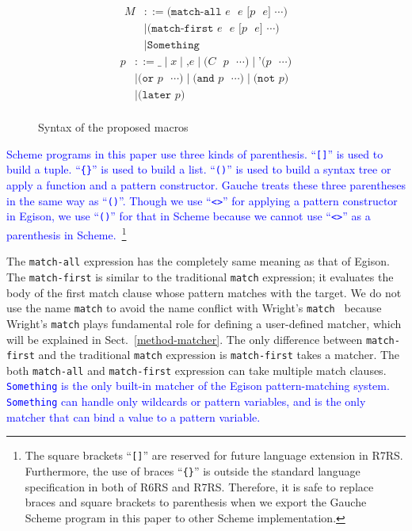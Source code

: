 \documentclass[acmlarge]{acmart}
\newcommand{\new}[1]{\textcolor{blue}{#1}}
\begin{document}
\begin{figure}[h]
  \vspace{-3mm}
\begin{multicols}{2}
\noindent
\begin{align*}
M &::= \texttt{(match-all $e$ $e$ [$p$ $e$] $\cdots$)} \\
&\mid \texttt{(match-first $e$ $e$ [$p$ $e$] $\cdots$)} \\
&\mid \texttt{Something}
\end{align*}
\columnbreak
\begin{align*}
p &::= \texttt{_} \mid \texttt{$x$} \mid \texttt{,$e$} \mid \texttt{($C$ $p$ $\cdots$)} \mid \texttt{'($p$ $\cdots$)} \\
&\mid \texttt{(or $p$ $\cdots$)} \mid \texttt{(and $p$ $\cdots$)} \mid \texttt{(not $p$)} \\
&\mid \texttt{(later $p$)} \\
\end{align*}
\end{multicols}
  \vspace{-8mm}
  \caption{Syntax of the proposed macros}
  \label{fig:syntax}
\end{figure}

\new{
Scheme programs in this paper use three kinds of parenthesis.
``\lstinline{[]}'' is used to build a tuple.
``\texttt{\{\}}'' is used to build a list. %
``\lstinline{()}'' is used to build a syntax tree or apply a function and a pattern constructor.
Gauche treats these three parentheses in the same way as ``\lstinline{()}''.
Though we use ``\lstinline{<>}'' for applying a pattern constructor in Egison, we use ``\lstinline{()}'' for that in Scheme because we cannot use ``\lstinline{<>}'' as a parenthesis in Scheme.~\footnote{The square brackets ``\lstinline{[]}'' are reserved for future language extension in R7RS.
Furthermore, the use of braces ``\texttt{\{\}}'' is outside the standard language specification in both of R6RS and R7RS.
Therefore, it is safe to replace braces and square brackets to parenthesis when we export the Gauche Scheme program in this paper to other Scheme implementation.
}
}%

The \texttt{match-all} expression has the completely same meaning as that of Egison.
The \texttt{match-first} is similar to the traditional \texttt{match} expression; it evaluates the body of the first match clause whose pattern matches with the target.
We do not use the name \texttt{match} to avoid the name conflict with Wright's \texttt{match}~\cite{wright1993pattern} because Wright's \texttt{match} plays fundamental role for defining a user-defined matcher, which will be explained in Sect.~\ref{method-matcher}.
The only difference between \texttt{match-first} and the traditional \texttt{match} expression is \texttt{match-first} takes a matcher.
The both \texttt{match-all} and \texttt{match-first} expression can take multiple match clauses.
\new{
\lstinline{Something} is the only built-in matcher of the Egison pattern-matching system.
\lstinline{Something} can handle only wildcards or pattern variables, and is the only matcher that can bind a value to a pattern variable.
}%
\end{document}
